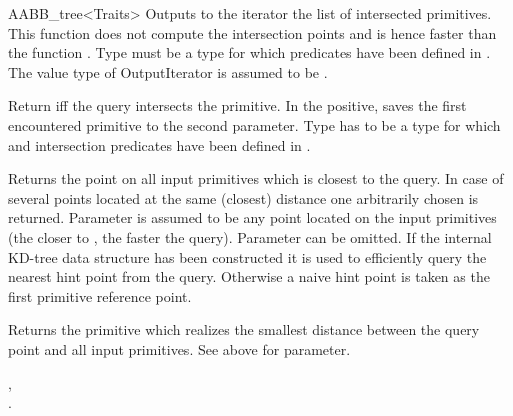 \begin{ccRefClass}{AABB_tree<Traits>}
{Outputs to the iterator the list of intersected primitives. This function does not compute the intersection points and is hence faster than the function . Type  must be a type for which  predicates have been defined in . The value type of OutputIterator is assumed to be .}

	
{Return  iff the query intersects the primitive. In the positive, saves the first encountered primitive to the second parameter. Type  has to be a type for which  and intersection predicates have been defined in .}


{Returns the point on all input primitives which is closest to the query. In case of several points located at the same (closest) distance one arbitrarily chosen is returned.  Parameter  is assumed to be any point located on the input primitives (the closer  to , the faster the query). Parameter  can be omitted. If the internal KD-tree data structure has been constructed it is used to efficiently query the nearest hint point from the query. Otherwise a naive hint point is taken as the first primitive reference point. }

{Returns the primitive which realizes the smallest distance between the query point and all input primitives. See above for  parameter. }

\ccSeeAlso

, \\
.

\end{ccRefClass}

\ccRefPageEnd

